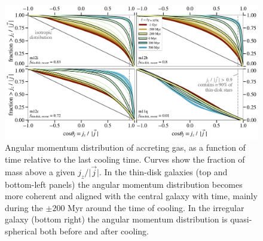 \documentclass[fleqn,usenatbib]{mnras}
\begin{document}

\begin{figure}
    \centering
    \includegraphics[width=\textwidth]{figures/jzjmag_vs_t.pdf}
    \caption{
    Angular momentum distribution of accreting gas, as a function of time relative to the last cooling time. Curves show the fraction of mass above a given $j_z / \vert \vec j \vert$. 
    In the thin-disk galaxies (top and bottom-left panels) the angular momentum distribution becomes more coherent and aligned with the central galaxy with time, mainly during the $\pm200$ Myr around the time of cooling. In the irregular galaxy (bottom right) the angular momentum distribution is quasi-spherical both before and after cooling. 
    }
    \label{f: coherence}
\end{figure}
\end{document}
